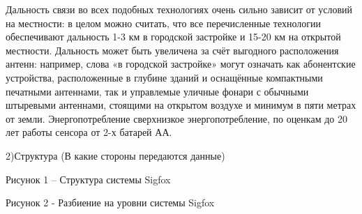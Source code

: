Дальность связи во всех подобных технологиях очень сильно зависит от условий на местности: в целом можно считать, что все перечисленные технологии обеспечивают дальность 1-3 км в городской застройке и 15-20 км на открытой местности. Дальность может быть увеличена за счёт выгодного расположения антенн: например, слова «в городской застройке» могут означать как абонентские устройства, расположенные в глубине зданий и оснащённые компактными печатными антеннами, так и управлемые уличные фонари с обычными штыревыми антеннами, стоящими на открытом воздухе и минимум в пяти метрах от земли.
Энергопотребление
сверхнизкое энергопотребление, по оценкам до 20 лет работы сенсора от 2-х батарей АА. 

2)Структура (В какие стороны передаются данные)





















Рисунок 1  – Структура системы Sigfox 









Рисунок 2  - Разбиение на уровни системы Sigfox


